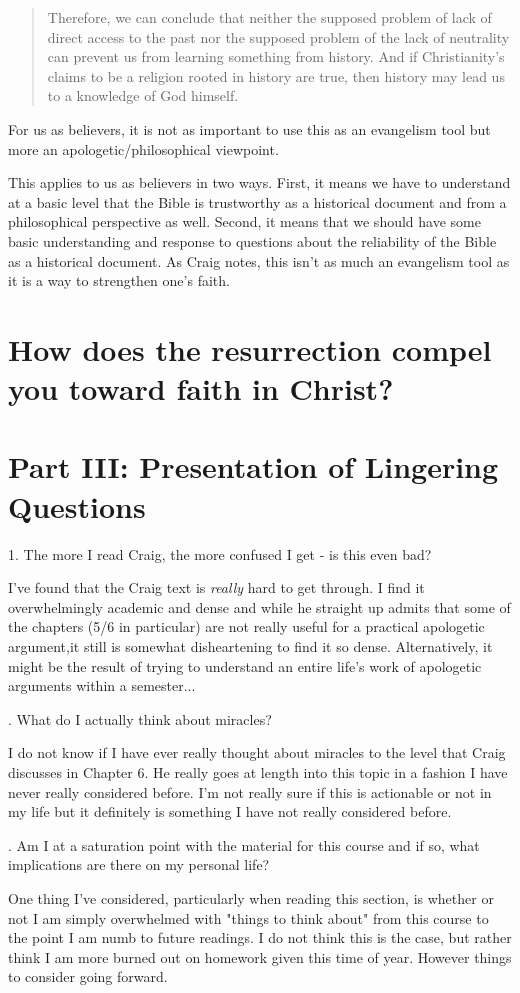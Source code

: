 \documentclass[12pt]{turabian-researchpaper}
\begin{document}
\begin{quote}
Therefore, we can conclude that neither the supposed problem of lack of direct access to the past nor the supposed problem of the lack of neutrality can prevent us from learning something from history. And if Christianity's  claims to be a religion rooted in history are true, then history may lead us to a knowledge of God himself.
\end{quote}

For us as believers, it is not as important to use this as an evangelism tool but more an apologetic/philosophical viewpoint.

This applies to us as believers in two ways. First, it means we have to understand at a basic level that the Bible is trustworthy as a historical document and from a philosophical perspective as well. Second, it means that we should have some basic understanding and response to questions about the reliability of the Bible as a historical document. As Craig notes, this isn't as much an evangelism tool as it is a way to strengthen one's faith.

\section{How does the resurrection compel you toward faith in Christ?}

\section{Part III: Presentation of Lingering Questions}

1. The more I read Craig, the more confused I get - is this even bad?

I've found that the Craig text is \textit{really} hard to get through. I find it overwhelmingly academic and dense and while he straight up admits that some of the chapters (5/6 in particular) are not really useful for a practical apologetic argument,it still is somewhat disheartening to find it so dense. Alternatively, it might be the result of trying to understand an entire life's work of apologetic arguments within a semester...

. What do I actually think about miracles?

I do not know if I have ever really thought about miracles to the level that Craig discusses in Chapter 6. He really goes at length into this topic in a fashion I have never really considered before. I'm not really sure if this is actionable or not in my life but it definitely is something I have not really considered before.

. Am I at a saturation point with the material for this course and if so, what implications are there on my personal life?

One thing I've considered, particularly when reading this section, is whether or not I am simply overwhelmed with "things to think about" from this course to the point I am numb to future readings. I do not think this is the case, but rather think I am more burned out on homework given this time of year. However things to consider going forward.


\newpage
\printbibliography
\end{document}
